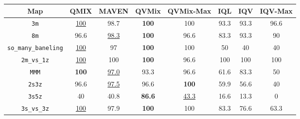 \setlength\tabcolsep{4.5pt}
\begin{tabular}{cccccccc}
        \toprule
        
        Map & QMIX & MAVEN &     QVMix & QVMix-Max  & IQL & IQV & IQV-Max\\
        \midrule
         \texttt{3m} & \underline{100} & 98.7 &   \textbf{100} & 100 & 93.3 & 93.3& 96.6 \\
        
         \texttt{8m} & 96.6& \underline{98.3} &  \textbf{100} & 96.6 & 83.3& 93.3& 90\\
        
         \texttt{so\_many\_baneling} & \underline{100} & 97  & \textbf{100}& 100& 50 & 40 & 40\\
        
        \texttt{2m\_vs\_1z} & \underline{100} & 100 &\textbf{100} & 96.6  & 100 & 100 & 100\\
        \midrule
        
       \texttt{MMM} & \textbf{100} & \underline{97.0} & 93.3 & 96.6  & 61.6 & 83.3 & 50 \\
        
        \texttt{2s3z}  & 96.6 & \underline{97.5} &  96.6 & \textbf{100} & 59.9 & 56.6 & 40 \\
        
        \texttt{3s5z} & 40 & 40.8 &\textbf{86.6} & \underline{43.3}  & 16.6 & 13.3 & 0 \\
        
        \texttt{3s\_vs\_3z}  & \underline{100} & 97.9  &  \textbf{100} & 100  & 83.3 & 76.6 & 63.3 \\
        \bottomrule
    \end{tabular}
    
        
        
